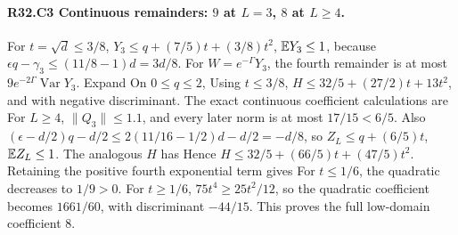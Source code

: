 \paragraph{R32.C3 Continuous remainders: \(9\) at \(L=3\), \(8\) at \(L\ge4\).}
For \(t=\sqrt d\le3/8\), \(Y_3\le q+(7/5)t+(3/8)t^2\), \(\mathbb E Y_3\le1\),
because \(\epsilon q-\gamma_3\le(11/8-1)d=3d/8\).
For \(W=e^{-\Gamma}Y_3\), the fourth remainder is at most
\(9e^{-2\Gamma}\operatorname{Var}Y_3\). Expand
On \(0\le q\le2\),
Using \(t\le3/8\), \(H\le32/5+(27/2)t+13t^2\), and
with negative discriminant. The exact continuous coefficient calculations are
For \(L\ge4\), \(\lVert Q_3\rVert\le1.1\), and every later norm is
at most \(17/15<6/5\). Also
\((\epsilon-d/2)q-d/2\le2(11/16-1/2)d-d/2=-d/8\), so
\(Z_L\le q+(6/5)t\), \(\mathbb E Z_L\le1\). The analogous \(H\) has
Hence \(H\le32/5+(66/5)t+(47/5)t^2\). Retaining the positive fourth
exponential term gives
For \(t\le1/6\), the quadratic decreases to \(1/9>0\).
For \(t\ge1/6\), \(75t^4\ge25t^2/12\), so the quadratic coefficient
becomes \(1661/60\), with discriminant \(-44/15\). This proves the
full low-domain coefficient \(8\).

